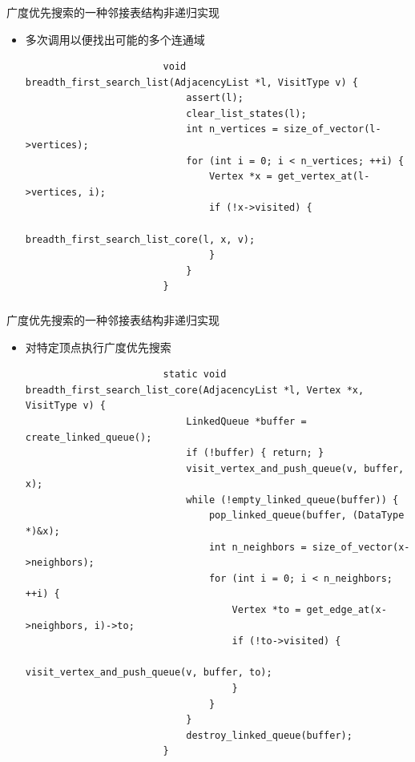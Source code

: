 \begin{fragile}
    \frametitle{\insertsubsectionhead}
    \begin{block}{广度优先搜索的一种\alert{邻接表}结构非递归实现}
        \begin{itemize}
            \item 多次调用以便找出可能的多个连通域
                    \begin{verbatim}
                        void breadth_first_search_list(AdjacencyList *l, VisitType v) {
                            assert(l);
                            clear_list_states(l);
                            int n_vertices = size_of_vector(l->vertices);
                            for (int i = 0; i < n_vertices; ++i) {
                                Vertex *x = get_vertex_at(l->vertices, i);
                                if (!x->visited) {
                                    breadth_first_search_list_core(l, x, v);
                                }
                            }
                        }
                    \end{verbatim}
        \end{itemize}
    \end{block}
\end{fragile}

\begin{fragile}
    \frametitle{\insertsubsectionhead}
    \begin{block}{广度优先搜索的一种\alert{邻接表}结构非递归实现}
        \begin{itemize}
            \item 对特定顶点执行广度优先搜索
                    \begin{verbatim}
                        static void breadth_first_search_list_core(AdjacencyList *l, Vertex *x, VisitType v) {
                            LinkedQueue *buffer = create_linked_queue();
                            if (!buffer) { return; }
                            visit_vertex_and_push_queue(v, buffer, x);
                            while (!empty_linked_queue(buffer)) {
                                pop_linked_queue(buffer, (DataType *)&x);
                                int n_neighbors = size_of_vector(x->neighbors);
                                for (int i = 0; i < n_neighbors; ++i) {
                                    Vertex *to = get_edge_at(x->neighbors, i)->to;
                                    if (!to->visited) {
                                        visit_vertex_and_push_queue(v, buffer, to);
                                    }
                                }
                            }
                            destroy_linked_queue(buffer);
                        }
                    \end{verbatim}
        \end{itemize}
    \end{block}
\end{fragile}